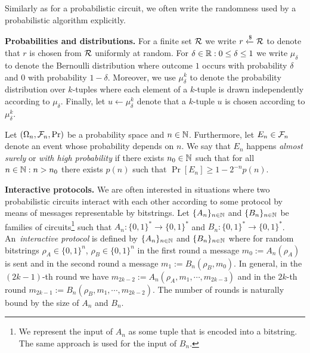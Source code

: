 Similarly as for a probabilistic circuit, we often write the randomness used by a probabilistic algorithm explicitly.


\textbf{Probabilities and distributions.}
For a finite set $\mathcal{R}$ we write $r \xleftarrow{\$} \mathcal{R}$ to denote that $r$ is chosen from $\mathcal{R}$ uniformly at random.
For $\delta \in \mathbb{R} : 0 \leq \delta \leq 1$ we write $\mu_{\delta}$ to denote the Bernoulli distribution where outcome $1$ occurs with
probability $\delta$ and $0$ with probability $1-\delta$.
Moreover, we use $\mu_{\delta}^k$ to denote the probability distribution over $k$-tuples
where each element of a $k$-tuple is drawn independently according to $\mu_{\delta}$.
Finally, let $u \leftarrow \mu_{\delta}^k$ denote that a $k$-tuple $u$ is chosen according to $\mu_{\delta}^k$.


Let $(\Omega_n, \mathcal{F}_n, \Pr)$ be a probability space and $n \in \mathbb{N}$.
Furthermore, let $E_n \in \mathcal{F}_n$ denote an event whose probability depends on $n$.
We say that $E_n$ happens \textit{almost surely} or \textit{with high probability} if
there exists $n_0 \in \mathbb{N}$ such that for all $n \in \mathbb{N} : n > n_0$ there exists $p(n)$ such that $\Pr[E_n] \geq 1 - 2^{-n} \mathit{p}(n)$.

\textbf{Interactive protocols.}
\enlargethispage{\baselineskip}
We are often interested in situations where two probabilistic circuits interact with
each other according to some protocol by means of messages representable by bitstrings.
Let $\{A_n\}_{n \in \mathbb{N}}$ and $\{B_n\}_{n \in \mathbb{N}}$ be families of circuits\footnote{
We represent the input of $A_n$ as some tuple that is encoded into a bitstring.
The same approach is used for the input of $B_n$.}
such that $A_n : \{0,1\}^{*} \rightarrow \{0,1\}^{*}$ and $B_n : \{0,1\}^{*} \rightarrow \{0,1\}^{*}$.
An~\textit{interactive protocol} is defined by $\{A_n\}_{n \in \mathbb{N}}$ and $\{B_n\}_{n \in \mathbb{N}}$ where
for random bitstrings $\rho_A \in \{0,1\}^{n}$, $\rho_B \in \{0,1\}^{n}$ in the first round a message $m_0 := A_n(\rho_A)$ is sent and in the second round a message $m_1 := B_n(\rho_B, m_0)$.
In general, in the $(2k\!-\!1)$-th round we have $m_{2k-2} := A_n(\rho_A, m_1, \cdots, m_{2k-3})$ and in the $2k$-th round $m_{2k-1} := B_n(\rho_B, m_1, \cdots, m_{2k-2})$.
The number of rounds is naturally bound by the size of $A_n$ and $B_n$.


